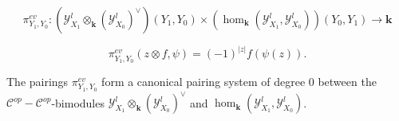 \documentclass[10pt,a4paper]{amsart}
\def\K{{\mathbf{k}}}
\def\Y{\mathcal{Y}}
\def\cc{\mathcal{C}}
\begin{document}
\begin{equation}\label{hom pairing}
\pi^{ev}_{Y_{1}, Y_{0}}: (\Y^{l}_{X_{1}} \otimes_{\K} (\Y^{l}_{X_{0}})^{\vee})(Y_{1}, Y_{0}) \times (\hom_{\K}(\Y^{l}_{X_{1}}, \Y^{l}_{X_{0}}))(Y_{0}, Y_{1}) \to \K
\end{equation}

\begin{equation}\label{hom pairing formula}
\pi^{ev}_{Y_{1}, Y_{0}}( z \otimes f, \psi) = (-1)^{|z|} f(\psi(z)).
\end{equation}

\begin{lem}\label{lem: hom pairing canonical}
The pairings $\pi^{ev}_{Y_{1}, Y_{0}}$ form a canonical pairing system of degree $0$ between the $\cc^{op}-\cc^{op}$-bimodules $\Y^{l}_{X_{1}} \otimes_{\K} (\Y^{l}_{X_{0}})^{\vee}$ and $\hom_{\K}(\Y^{l}_{X_{1}}, \Y^{l}_{X_{0}})$.
\end{lem}
\end{document}
